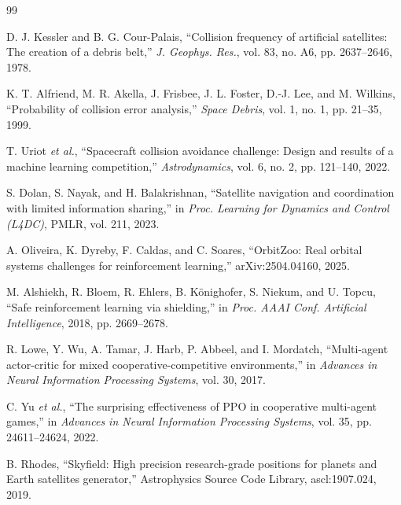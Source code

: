 \documentclass[conference]{IEEEtran}
\begin{document}
\begin{thebibliography}{99}

D. J. Kessler and B. G. Cour-Palais, ``Collision frequency of artificial satellites: The creation of a debris belt,'' \textit{J. Geophys. Res.}, vol. 83, no. A6, pp. 2637--2646, 1978.

K. T. Alfriend, M. R. Akella, J. Frisbee, J. L. Foster, D.-J. Lee, and M. Wilkins, ``Probability of collision error analysis,'' \textit{Space Debris}, vol. 1, no. 1, pp. 21--35, 1999.

T. Uriot \textit{et al.}, ``Spacecraft collision avoidance challenge: Design and results of a machine learning competition,'' \textit{Astrodynamics}, vol. 6, no. 2, pp. 121--140, 2022.

S. Dolan, S. Nayak, and H. Balakrishnan, ``Satellite navigation and coordination with limited information sharing,'' in \textit{Proc. Learning for Dynamics and Control (L4DC)}, PMLR, vol. 211, 2023.

A. Oliveira, K. Dyreby, F. Caldas, and C. Soares, ``OrbitZoo: Real orbital systems challenges for reinforcement learning,'' arXiv:2504.04160, 2025.

M. Alshiekh, R. Bloem, R. Ehlers, B. K\"onighofer, S. Niekum, and U. Topcu, ``Safe reinforcement learning via shielding,'' in \textit{Proc. AAAI Conf. Artificial Intelligence}, 2018, pp. 2669--2678.

R. Lowe, Y. Wu, A. Tamar, J. Harb, P. Abbeel, and I. Mordatch, ``Multi-agent actor-critic for mixed cooperative-competitive environments,'' in \textit{Advances in Neural Information Processing Systems}, vol. 30, 2017.

C. Yu \textit{et al.}, ``The surprising effectiveness of PPO in cooperative multi-agent games,'' in \textit{Advances in Neural Information Processing Systems}, vol. 35, pp. 24611--24624, 2022.

B. Rhodes, ``Skyfield: High precision research-grade positions for planets and Earth satellites generator,'' Astrophysics Source Code Library, ascl:1907.024, 2019.

\end{thebibliography}
\end{document}
